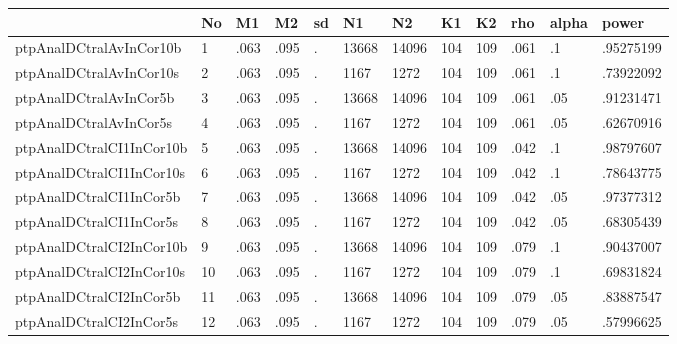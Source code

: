 \begin{tabular}{|l|l|l|l|l|l|l|l|l|l|l|l|}\hline  
 & No  & M1  & M2  & sd  & N1  & N2  & K1  & K2  & rho  & alpha  & power  \\ \hline  
ptpAnalDCtralAvInCor10b & 1 & .063 & .095 & . & 13668 & 14096 & 104 & 109 & .061 & .1 & .95275199 \\ \hline 
ptpAnalDCtralAvInCor10s & 2 & .063 & .095 & . & 1167 & 1272 & 104 & 109 & .061 & .1 & .73922092 \\ \hline 
ptpAnalDCtralAvInCor5b & 3 & .063 & .095 & . & 13668 & 14096 & 104 & 109 & .061 & .05 & .91231471 \\ \hline 
ptpAnalDCtralAvInCor5s & 4 & .063 & .095 & . & 1167 & 1272 & 104 & 109 & .061 & .05 & .62670916 \\ \hline 
ptpAnalDCtralCI1InCor10b & 5 & .063 & .095 & . & 13668 & 14096 & 104 & 109 & .042 & .1 & .98797607 \\ \hline 
ptpAnalDCtralCI1InCor10s & 6 & .063 & .095 & . & 1167 & 1272 & 104 & 109 & .042 & .1 & .78643775 \\ \hline 
ptpAnalDCtralCI1InCor5b & 7 & .063 & .095 & . & 13668 & 14096 & 104 & 109 & .042 & .05 & .97377312 \\ \hline 
ptpAnalDCtralCI1InCor5s & 8 & .063 & .095 & . & 1167 & 1272 & 104 & 109 & .042 & .05 & .68305439 \\ \hline 
ptpAnalDCtralCI2InCor10b & 9 & .063 & .095 & . & 13668 & 14096 & 104 & 109 & .079 & .1 & .90437007 \\ \hline 
ptpAnalDCtralCI2InCor10s & 10 & .063 & .095 & . & 1167 & 1272 & 104 & 109 & .079 & .1 & .69831824 \\ \hline 
ptpAnalDCtralCI2InCor5b & 11 & .063 & .095 & . & 13668 & 14096 & 104 & 109 & .079 & .05 & .83887547 \\ \hline 
ptpAnalDCtralCI2InCor5s & 12 & .063 & .095 & . & 1167 & 1272 & 104 & 109 & .079 & .05 & .57996625 \\ \hline 
  \end{tabular}
